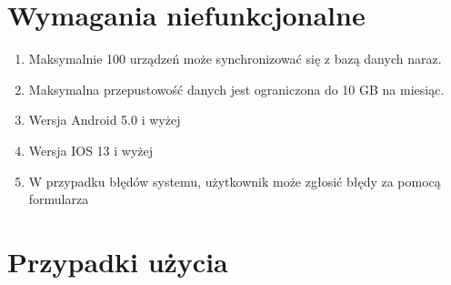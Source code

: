 \section{Wymagania niefunkcjonalne}
\begin{enumerate}
  \item Maksymalnie 100 urządzeń może synchronizować się z bazą danych naraz.
  \item Maksymalna przepustowość danych jest ograniczona do 10 GB na miesiąc.
  \item Wersja Android 5.0 i wyżej
  \item Wersja IOS 13 i wyżej
  \item W przypadku błędów systemu, użytkownik może zgłosić błędy za pomocą formularza
\end{enumerate}

\section{Przypadki użycia}
